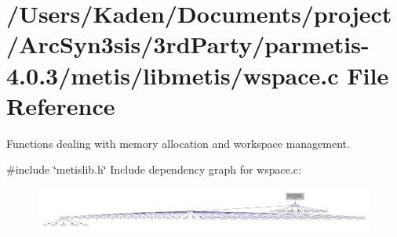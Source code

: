 \hypertarget{a00981}{}\section{/\+Users/\+Kaden/\+Documents/project/\+Arc\+Syn3sis/3rd\+Party/parmetis-\/4.0.3/metis/libmetis/wspace.c File Reference}
\label{a00981}


Functions dealing with memory allocation and workspace management.  


{\ttfamily \#include \char`\"{}metislib.\+h\char`\"{}}\newline
Include dependency graph for wspace.\+c\+:\nopagebreak
\begin{figure}[H]
\begin{center}
\leavevmode
\includegraphics[width=350pt]{a00982}
\end{center}
\end{figure}
